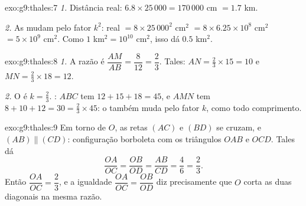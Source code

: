 \begin{solution}{exo:g9:thales:7}
\emph{1.} Distância real: $6.8 \times 25\,000 = 170\,000$ cm
$= 1.7$ km.

\emph{2.} As  mudam pelo fator $k^2$:  real
$= 8 \times 25\,000^2$ cm$^2$ $= 8 \times 6.25 \times 10^8$ cm$^2$
$= 5 \times 10^9$ cm$^2$. Como $1$ km$^2 = 10^{10}$ cm$^2$, isso dá
$0.5$ km$^2$.
\end{solution}

\begin{solution}{exo:g9:thales:8}
\emph{1.} A razão é $\dfrac{AM}{AB} = \dfrac{8}{12} = \dfrac23$.
Tales: $AN = \frac23 \times 15 = 10$ e $MN = \frac23 \times 18 = 12$.

\emph{2.} O  é $k = \frac23$. : $ABC$ tem
$12 + 15 + 18 = 45$, e $AMN$ tem
$8 + 10 + 12 = 30 = \frac23 \times 45$: o  também muda pelo
fator $k$, como todo comprimento.
\end{solution}

\begin{solution}{exo:g9:thales:9}
Em torno de $O$, as retas $(AC)$ e $(BD)$ se cruzam, e
$(AB) \parallel (CD)$: configuração borboleta com os triângulos $OAB$ e
$OCD$. Tales dá
\[
\frac{OA}{OC} = \frac{OB}{OD} = \frac{AB}{CD} = \frac46 = \frac23 .
\]
Então $\dfrac{OA}{OC} = \dfrac23$, e a igualdade
$\dfrac{OA}{OC} = \dfrac{OB}{OD}$ diz precisamente que $O$ corta as
duas diagonais na mesma razão.
\end{solution}

